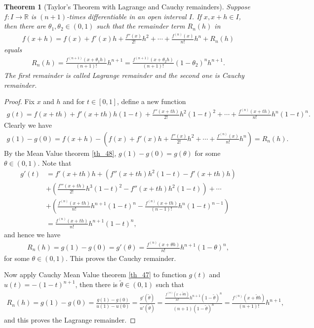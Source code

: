 \documentclass[11pt]{book}
\newtheorem{theorem}{Theorem}[chapter]
\theoremstyle{definition}
\numberwithin{equation}{chapter}
\begin{document}
\begin{theorem}[Taylor's Theorem with Lagrange and Cauchy remainders]\label{th_628}
Suppose $f: I \to \mathbb{R}$ is $(n+1)$-times differentiable in an open interval $I$. If $x, x + h \in I$, then there are $\theta_1, \theta_2 \in (0,1)$ such that the remainder term $R_n(h)$ in
\begin{align*}
    f(x + h) = f(x) + f'(x)h + \frac{f''(x)}{2!}h^2 + \cdots + \frac{f^{(n)}(x)}{n!}h^n + R_n(h)
\end{align*}
equals
\begin{align*}
    R_n(h) = \frac{f^{(n+1)}(x+\theta_1 h)}{(n+1)!} h^{n+1} = \frac{f^{(n+1)}(x+\theta_2 h)}{(n+1)!} (1-\theta_2)^n h^{n+1}.
\end{align*}
The first remainder is called Lagrange remainder and the second one is Cauchy remainder.
\end{theorem}
\begin{proof}
Fix $x$ and $h$ and for $t \in [0,1]$, define a new function
\begin{align*}
    g(t) = f(x+th) + f'(x+th)h(1-t) + \frac{f''(x+th)}{2!} h^2 (1-t)^2 + \cdots + \frac{f^{(n)}(x+th)}{n!} h^n (1-t)^n.
\end{align*}
Clearly we have 
\begin{align*}
    g(1) - g(0) = f(x+h) - \left(f(x) + f'(x)h + \frac{f''(x)}{2!}h^2 + \cdots + \frac{f^{(n)}(x)}{n!}h^n\right) = R_n(h).
\end{align*}
By the Mean Value theorem \ref{th_48}, $g(1) - g(0) = g(\theta)$ for some $\theta \in (0,1)$. Note that
\begin{align*}
    g'(t) & = f'(x+th)h + \left(f''(x+th)h^2(1-t) - f'(x+th)h\right) \\
    & + \left(\frac{f'''(x+th)}{2!} h^3 (1-t)^2 - f''(x+th)h^2(1-t)\right) + \cdots \\
    & + \left(\frac{f^{(n)}(x+th)}{n!} h^{n+1} (1-t)^n - \frac{f^{(n)}(x+th)}{(n-1)!} h^n (1-t)^{n-1}\right) \\
    & = \frac{f^{(n)}(x+th)}{n!} h^{n+1} (1-t)^n,
\end{align*}
and hence we have
\begin{align*}
    R_n(h) = g(1) - g(0) = g'(\theta) = \frac{f^{(n)}(x+\theta h)}{n!} h^{n+1} (1-\theta)^n,
\end{align*}
for some $\theta \in (0,1)$. This proves the Cauchy remainder.

Now apply Cauchy Mean Value theorem \ref{th_47} to function $g(t)$ and $u(t) = -(1 - t)^{n+1}$, then there is $\widetilde{\theta} \in (0,1)$ such that
\begin{align*}
    R_n(h) = g(1) - g(0) = \frac{g(1) - g(0)}{u(1) - u(0)} = \frac{g'(\widetilde{\theta})}{u'(\widetilde{\theta})} = \frac{\frac{f^{(n)}(x+\widetilde{\theta} h)}{n!} h^{n+1} (1-\widetilde{\theta})^n}{(n+1)(1 - \widetilde{\theta})^n} = \frac{f^{(n)}(x+\widetilde{\theta} h)}{(n+1)!} h^{n+1},
\end{align*}
and this proves the Lagrange remainder.
\end{proof}
\end{document}
